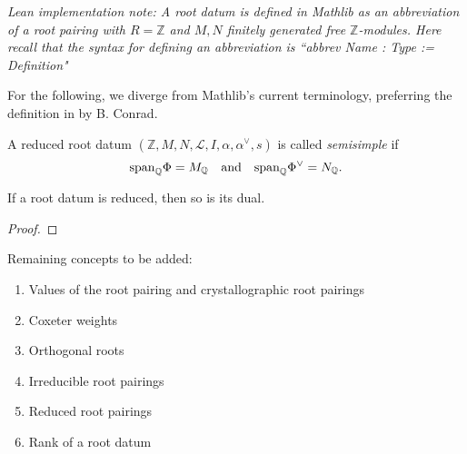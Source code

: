 {\it Lean implementation note: A root datum is defined in Mathlib as an abbreviation of 
a root pairing with $R = \mathbb{Z}$ and $M,N$ finitely generated free $\mathbb{Z}$-modules. Here 
recall that the syntax for defining an abbreviation is ``abbrev Name : Type := Definition"}

For the following, we diverge from Mathlib's current terminology, preferring the definition in 
by B. Conrad. 
\begin{definition}
    \label{def:rp-semisimple}
    \leanok
    A reduced root datum $(\mathbb{Z},M,N,\mathcal{L},I,\alpha, \alpha^\vee,s)$ is called {\it semisimple} if
    \[
        {\rm span}_{\mathbb{Q}} \Phi = M_{\mathbb{Q}} \quad \text{and} \quad {\rm span}_{\mathbb{Q}} \Phi^\vee = N_{\mathbb{Q}}.
    \] 
\end{definition}

\begin{lemma}
    If a root datum is reduced, then so is its dual. 
\end{lemma}
\begin{proof}
    
\end{proof}




Remaining concepts to be added:
\begin{enumerate}
    \item Values of the root pairing and crystallographic root pairings
    \item Coxeter weights
    \item Orthogonal roots 
    \item Irreducible root pairings
    \item Reduced root pairings
    \item Rank of a root datum 
\end{enumerate}